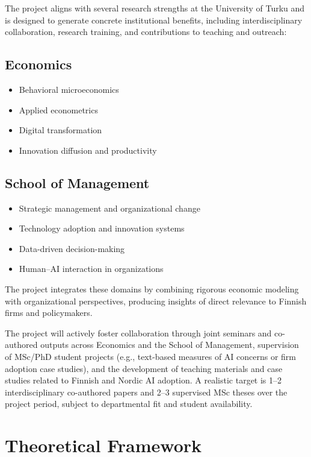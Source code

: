 \documentclass{nfr}
\begin{document}
The project aligns with several research strengths at the University of Turku and is designed to generate concrete institutional benefits, including interdisciplinary collaboration, research training, and contributions to teaching and outreach:

\subsection{Economics}

\begin{itemize}
\item Behavioral microeconomics
\item Applied econometrics
\item Digital transformation
\item Innovation diffusion and productivity
\end{itemize}

\subsection{School of Management}

\begin{itemize}
\item Strategic management and organizational change
\item Technology adoption and innovation systems
\item Data-driven decision-making
\item Human–AI interaction in organizations
\end{itemize}

The project integrates these domains by combining rigorous economic modeling with organizational perspectives, producing insights of direct relevance to Finnish firms and policymakers.

The project will actively foster collaboration through joint seminars and co-authored outputs across Economics and the School of Management, supervision of MSc/PhD student projects (e.g., text-based measures of AI concerns or firm adoption case studies), and the development of teaching materials and case studies related to Finnish and Nordic AI adoption. A realistic target is 1--2 interdisciplinary co-authored papers and 2--3 supervised MSc theses over the project period, subject to departmental fit and student availability.

\section{Theoretical Framework}
\end{document}
